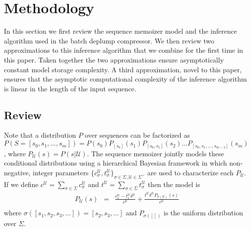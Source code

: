 \section{Methodology}
\newcommand{\T}{\ensuremath{\mathcal{T}}}
\newcommand{\N}{\ensuremath{\mathcal{N}}}
\newcommand{\M}{\ensuremath{\mathcal{M}}}
\newcommand{\PP}{\ensuremath{\mathcal{P}}}
\newcommand{\nc}{\ensuremath{nc}}
\newcommand{\RS}{\ensuremath{\mathcal{R}}}
\newcommand{\D}{\ensuremath{\mathcal{D}}}
\newcommand{\la}{\ensuremath{\leftarrow}}
\newcommand{\G}{\ensuremath{\mathcal{G}}}
\newcommand{\IS}{\ensuremath{\mathcal{I}}}
\newcommand{\Seq}{\ensuremath{\mathcal{S}}}
\newcommand{\dd}{\ensuremath{\delta}}
\newcommand{\U}{\mathcal{U}}
\label{section:methodology}

In this section we first review the sequence memoizer model and the inference algorithm used in the batch deplump compressor. We then review two approximations to this inference algorithm that we combine for the first time in this paper.  Taken together the two approximations ensure asymptotically constant model storage complexity.  A third approximation, novel to this paper, ensures that the asymptotic computational complexity of the inference algorithm is linear in the length of the input sequence.

\subsection{Review}

Note that a distribution $P$ over sequences can be factorized as $P(S = [s_0, s_1, \ldots, s_m]) = P(s_0)P_{[s_0]}(s_1)P_{[s_0,s_1]}(s_2) \ldots P_{[s_0,s_1,\ldots,s_{m-1}]}(s_m)$, where $P_\U (s) = P(s | \U)$.  The sequence memoizer \citep{Wood2009} jointly models these conditional distributions using a hierarchical Bayesian framework in which non-negative, integer parameters $\{ c^\U_\sigma, t^\U_\sigma \}_{\sigma \in \Sigma, \U \in \Sigma^{+}}$ are used to characterize each $P_\U$.  If we define $c^\U = \sum_{\sigma \in \Sigma} c^\U_\sigma$ and $t^\U = \sum_{\sigma \in \Sigma} t^\U_\sigma$ then the model is
%
\begin{eqnarray*}
	P_\U(s) &=& \frac{c^\U_s - t^\U_s \delta^\U}{c^\U} +  \frac{t^\U \delta^\U  P_{ \sigma(\U)}(s) }{c^\U} \\
\end{eqnarray*}
%
\noindent where $\sigma([s_1, s_2, s_3, \ldots]) = [s_2,s_3, \ldots]$ and $P_{\sigma([])}$ is the uniform distribution over $\Sigma$.

